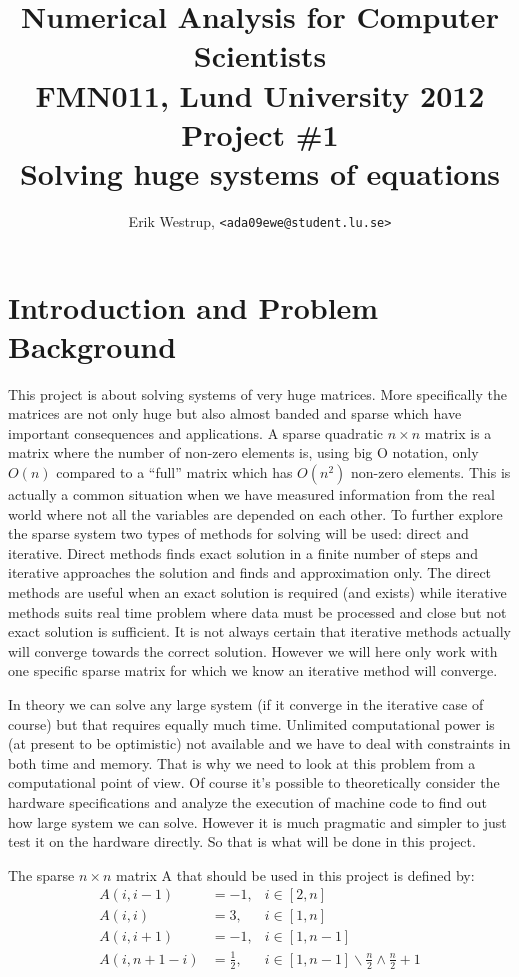 \documentclass[10pt, a4paper]{article}
\title{Numerical Analysis for Computer Scientists\\ FMN011, Lund University 2012\\ Project \#1\\ Solving huge systems of equations}
\date{}
\author{Erik Westrup, \texttt{<ada09ewe@student.lu.se>}}
\begin{document}
\begin{titlepage}
\maketitle

\thispagestyle{empty}
\end{titlepage}
\setcounter{page}{2}

\section{Introduction and Problem Background}
This project is about solving systems of very huge matrices. More specifically the matrices are not only huge but also almost banded and sparse which have important consequences and applications. A sparse quadratic $n\times n$  matrix is a matrix where the number of non-zero elements is, using big O notation, only $O(n)$ compared to a ``full'' matrix which has $O(n^2)$ non-zero elements. This is actually a common situation when we have measured information from the real world where not all the variables are depended on each other. To further explore the sparse system two types of methods for solving will be used: direct and iterative. Direct methods finds exact solution in a finite number of steps and iterative approaches the solution and finds and approximation only. The direct methods are useful when an exact solution is required (and exists) while iterative methods suits real time problem where data must be processed and close but not exact solution is sufficient. It is not always certain that iterative methods actually will converge towards the correct solution. However we will here only work with one specific sparse matrix for which we know an iterative method will converge.

In theory we can solve any large system (if it converge in the iterative case of course) but that requires equally much time. Unlimited computational power is (at present to be optimistic) not available and we have to deal with constraints in both time and memory. That is why we need to look at this problem from a computational point of view. Of course it's possible to theoretically consider the hardware specifications and analyze the execution of machine code to find out how large system we can solve. However it is much pragmatic and simpler to just test it on the hardware directly. So that is what will be done in this project. %

The sparse $n \times n$ matrix A that should be used in this project is defined by:
\begin{eqnarray} \label{matrix+a}
		A(i,i-1)   & =	-1, & i\in[2,n] \nonumber \\
		A(i,i)	   & =	3, & i\in[1,n] \nonumber \\
		A(i,i+1)   & =	-1, & i\in[1,n-1] \nonumber \\
		A(i,n+1-i) & =	\frac{1}{2}, & i\in[1,n-1]\backslash \frac{n}{2}\wedge\frac{n}{2}+1
\end{eqnarray}
\end{document}
